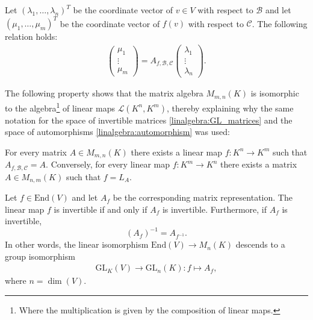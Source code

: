     \begin{property}\label{linalgebra:theorem:matrix_representation}
        Let $(\lambda_1,\ldots,\lambda_n)^T$ be the coordinate vector of $v\in V$ with respect to $\mathcal{B}$ and let $(\mu_1,\ldots,\mu_m)^T$ be the coordinate vector of $f(v)$ with respect to $\mathcal{C}$. The following relation holds:
        \begin{gather}
            \left(
            \begin{array}{c}
                \mu_1\\
                \vdots\\
                \mu_m
            \end{array}\right)
            = A_{f, \mathcal{B}, \mathcal{C}}
            \left(
            \begin{array}{c}
                \lambda_1\\
                \vdots\\
                \lambda_n
            \end{array}\right).
        \end{gather}
    \end{property}

    The following property shows that the matrix algebra $M_{m, n}(K)$ is isomorphic to the algebra\footnote{Where the multiplication is given by the composition of linear maps.} of linear maps $\mathcal{L}(K^n, K^m)$, thereby explaining why the same notation for the space of invertible matrices \ref{linalgebra:GL_matrices} and the space of automorphisms \ref{linalgebra:automorphism} was used:
    \begin{property}\label{linalgebra:theorem:map_matrix_link}
        For every matrix $A\in M_{m,n}(K)$ there exists a linear map $f:K^n\rightarrow K^m$ such that $A_{f, \mathcal{B}, \mathcal{C}} = A$. Conversely, for every linear map $f:K^m\rightarrow K^n$ there exists a matrix $A\in M_{n,m}(K)$ such that $f=L_A$.
    \end{property}

    \begin{result}\label{linalgebra:matrix_invertible_map}
        Let $f\in\text{End}(V)$ and let $A_f$ be the corresponding matrix representation. The linear map $f$ is invertible if and only if $A_f$ is invertible. Furthermore, if $A_f$ is invertible, \[\left(A_f\right)^{-1} = A_{f^{-1}}.\] In other words, the linear isomorphism $\text{End}(V)\rightarrow M_n(K)$ descends to a group isomorphism
        \begin{gather}
            \text{GL}_K(V)\rightarrow\text{GL}_n(K):f\mapsto A_f,
        \end{gather}
        where $n=\dim(V)$.
    \end{result}

